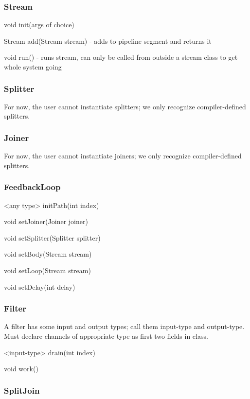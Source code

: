 \subsubsection{Stream}

void init(args of choice)

Stream add(Stream stream) - adds to pipeline segment and returns it

void run() - runs stream, can only be called from outside a stream
class to get whole system going

\subsubsection{Splitter}

For now, the user cannot instantiate splitters; we only recognize
compiler-defined splitters.

\subsubsection{Joiner}

For now, the user cannot instantiate joiners; we only recognize
compiler-defined splitters.

\subsubsection{FeedbackLoop}

<any type> initPath(int index)

void setJoiner(Joiner joiner)

void setSplitter(Splitter splitter)

void setBody(Stream stream)

void setLoop(Stream stream)

void setDelay(int delay)

\subsubsection{Filter}

A filter has some input and output types; call them input-type and
output-type.  Must declare channels of appropriate type as first two
fields in class.

<input-type> drain(int index)

void work()

\subsubsection{SplitJoin}

